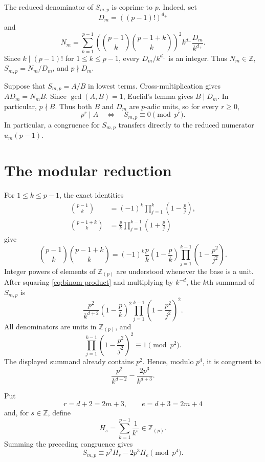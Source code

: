 \documentclass[11pt,reqno]{amsart}
\theoremstyle{remark}
\newcommand{\Z}{\mathbb Z}
\newcommand{\Zloc}{\mathbb Z_{(p)}}
\begin{document}
The reduced denominator of $S_{m,p}$ is coprime to $p$.  Indeed, set
$$
 D_m=((p-1)!)^{d_+}
$$
and
$$
 N_m=\sum_{k=1}^{p-1}
 \left(\binom{p-1}{k}\binom{p-1+k}{k}\right)^2
 k^{d_-}\frac{D_m}{k^{d_+}}.
$$
Since $k\mid(p-1)!$ for $1\leq k\leq p-1$, every
$D_m/k^{d_+}$ is an integer.  Thus $N_m\in\Z$,
$S_{m,p}=N_m/D_m$, and $p\nmid D_m$.

Suppose that $S_{m,p}=A/B$ in lowest terms.  Cross-multiplication gives
$AD_m=N_mB$.  Since $\gcd(A,B)=1$, Euclid's lemma gives $B\mid D_m$.
In particular, $p\nmid B$.  Thus both $B$ and $D_m$ are $p$-adic
units, so for every $r\geq0$,
\begin{equation}\label{eq:num-equiv}
 p^r\mid A
 \quad\Longleftrightarrow\quad
 S_{m,p}\equiv0\pmod{p^r}.
\end{equation}
In particular, a congruence for $S_{m,p}$ transfers directly to the
reduced numerator $u_m(p-1)$.

\section{The modular reduction}

For $1\leq k\leq p-1$, the exact identities
\begin{align*}
 \binom{p-1}{k}
 &=(-1)^k\prod_{j=1}^{k}\left(1-\frac pj\right),\\
 \binom{p-1+k}{k}
 &=\frac pk\prod_{j=1}^{k-1}\left(1+\frac pj\right)
\end{align*}
give
\begin{equation}\label{eq:binom-product}
 \binom{p-1}{k}\binom{p-1+k}{k}
 =(-1)^k\frac pk\left(1-\frac pk\right)
 \prod_{j=1}^{k-1}\left(1-\frac{p^2}{j^2}\right).
\end{equation}
Integer powers of elements of $\Zloc$ are understood whenever the base is
a unit.  After squaring \eqref{eq:binom-product} and multiplying by
$k^{-d}$, the $k$th summand of $S_{m,p}$ is
$$
 \frac{p^2}{k^{d+2}}\left(1-\frac pk\right)^2
 \prod_{j=1}^{k-1}\left(1-\frac{p^2}{j^2}\right)^2.
$$
All denominators are units in $\Zloc$, and
$$
 \prod_{j=1}^{k-1}\left(1-\frac{p^2}{j^2}\right)^2
 \equiv1\pmod{p^2}.
$$
The displayed summand already contains $p^2$.  Hence, modulo $p^4$, it
is congruent to
$$
 \frac{p^2}{k^{d+2}}-\frac{2p^3}{k^{d+3}}.
$$

Put
$$
 r=d+2=2m+3,\qquad e=d+3=2m+4
$$
and, for $s\in\Z$, define
$$
 H_s=\sum_{k=1}^{p-1}\frac1{k^s}\in\Zloc.
$$
Summing the preceding congruence gives
\begin{equation}\label{eq:first-reduction}
 S_{m,p}\equiv p^2H_r-2p^3H_e\pmod{p^4}.
\end{equation}
\end{document}
